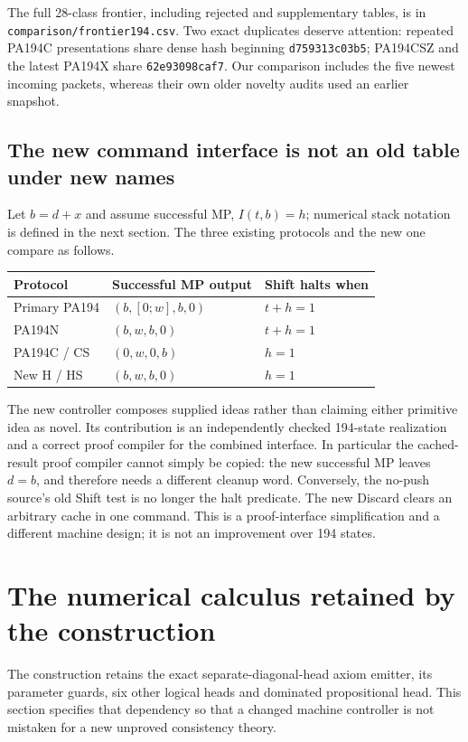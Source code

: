 \documentclass[11pt,letterpaper]{article}
\newcommand{\file}[1]{\texttt{\nolinkurl{#1}}}
\begin{document}
The full 28-class frontier, including rejected and supplementary tables,
is in \file{comparison/frontier194.csv}. Two exact duplicates deserve
attention: repeated PA194C presentations share dense hash beginning
\file{d759313c03b5}; PA194CSZ and the latest PA194X share
\file{62e93098caf7}. Our comparison includes the five newest incoming
packets, whereas their own older novelty audits used an earlier snapshot.

\subsection{The new command interface is not an old table under new names}

Let $b=d+x$ and assume successful MP, $I(t,b)=h$; numerical stack notation
is defined in the next section. The three existing protocols and the new
one compare as follows.
\begin{center}\small
\begin{tabular}{@{}lll@{}}\toprule
Protocol & Successful MP output & Shift halts when\\\midrule
Primary PA194 &$(b,[0;w],b,0)$&$t+h=1$\\
PA194N &$(b,w,b,0)$&$t+h=1$\\
PA194C / CS &$(0,w,0,b)$&$h=1$\\
New H / HS &$(b,w,b,0)$&$h=1$\\\bottomrule
\end{tabular}
\end{center}
The new controller composes supplied ideas rather than claiming either
primitive idea as novel. Its contribution is an independently checked
194-state realization and a correct proof compiler for the combined
interface. In particular the cached-result proof compiler cannot simply
be copied: the new successful MP leaves $d=b$, and therefore needs a
different cleanup word. Conversely, the no-push source's old Shift test
is no longer the halt predicate. The new Discard clears an arbitrary
cache in one command. This is a proof-interface simplification and a
different machine design; it is not an improvement over 194 states.

\section{The numerical calculus retained by the construction}
\label{sec:calculus}

The construction retains the exact separate-diagonal-head axiom emitter,
its parameter guards, six other logical heads and dominated propositional
head. This section specifies that dependency so that a changed machine
controller is not mistaken for a new unproved consistency theory.
\end{document}
